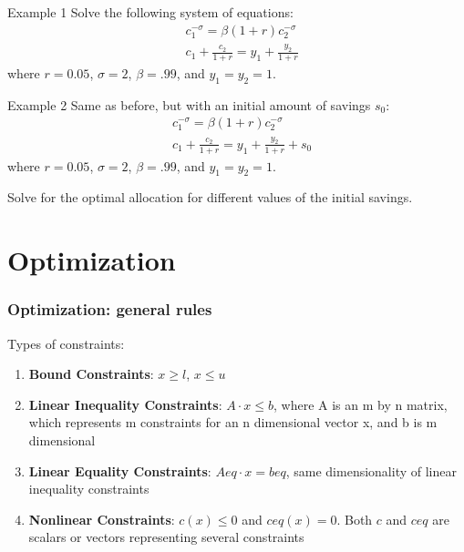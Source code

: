 \documentclass[show notes]{beamer}%
\begin{document}
{\begin{frame}[fragile]
\end{frame}



\begin{frame}[fragile]{Example 1}
Solve the following system of equations:
\begin{align*}
& c_1^{-\sigma} = \beta (1+r) c_2^{-\sigma} \\
& c_1 + \frac{c_2}{1+r} = y_1 + \frac{y_2}{1+r} 
\end{align*}
where $r=0.05$, $\sigma = 2$, $\beta = .99$, and $y_1 = y_2 = 1$.
\end{frame}


\begin{frame}[fragile]{Example 2}
Same as before, but with an initial amount of savings $s_0$:
\begin{align*}
& c_1^{-\sigma} = \beta (1+r) c_2^{-\sigma} \\
& c_1 + \frac{c_2}{1+r} = y_1 + \frac{y_2}{1+r} + s_0
\end{align*}
where $r=0.05$, $\sigma = 2$, $\beta = .99$, and $y_1 = y_2 = 1$.

Solve for the optimal allocation for different values of the initial savings. 
\end{frame}


\section{Optimization}


\begin{frame}[fragile]
\frametitle{Optimization: general rules}

Types of constraints:  \pause

\begin{enumerate}

\item \textbf{Bound Constraints}: $x \geq l$, $x \leq u$ \pause

\item \textbf{Linear Inequality Constraints}: $A \cdot x \leq  b$, where A is an m by n matrix, which represents m constraints for an n dimensional vector x, and b is m dimensional \pause

\item \textbf{Linear Equality Constraints}: $Aeq \cdot x = beq$, same dimensionality of linear inequality constraints \pause

\item \textbf{Nonlinear Constraints}: $c\left(x \right) \leq 0$ and $ceq\left(x\right) = 0$. Both $c$ and $ceq$ are scalars or vectors representing several constraints


\end{enumerate}
\end{frame}}
\end{document}
